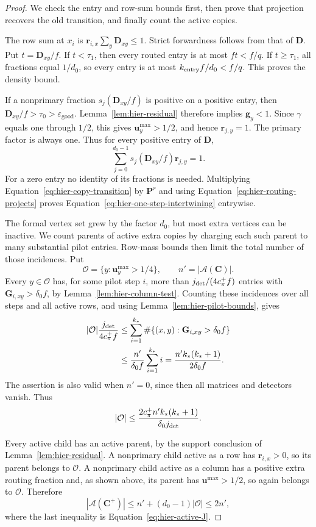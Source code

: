 \documentclass[11pt]{article}
\numberwithin{equation}{section}
\theoremstyle{definition}
\theoremstyle{remark}
\begin{document}
\begin{proof}
We check the entry and row-sum bounds first, then prove that projection recovers the old transition, and finally count the active copies.

The row sum at $x_i$ is ${\mathbf{r}}_{i,x}\sum_y{\mathbf{D}}_{xy}\leq1$.  Strict
forwardness follows from that of ${\mathbf{D}}$.  Put $t={\mathbf{D}}_{xy}/f$.  If
$t<\tau_1$, then every routed entry is at most $ft<f/q$.  If
$t\geq\tau_1$, all fractions equal $1/{d}_0$, so every entry is at
most ${k_{\rm entry}}f/{d}_0<f/q$.  This proves the density bound.

If a nonprimary fraction $s_j({\mathbf{D}}_{xy}/f)$ is positive on a positive
entry, then ${\mathbf{D}}_{xy}/f>\tau_0>\varepsilon_{\mathrm{good}}$.
Lemma~\ref{lem:hier-residual} therefore implies ${\mathbf{g}}_{y}<1$.
Since $\gamma$ equals one through $1/2$, this gives
${\mathbf{u}}^{\max}_{y}>1/2$, and hence ${\mathbf{r}}_{j,y}=1$.  The primary factor is
always one.  Thus for every positive entry of ${\mathbf{D}}$,
\begin{equation}
 \sum_{j=0}^{{d}_0-1}s_j({\mathbf{D}}_{xy}/f){\mathbf{r}}_{j,y}=1.
 \label{eq:hier-routing-projects}
\end{equation}
For a zero entry no identity of its fractions is needed.  Multiplying
Equation~\eqref{eq:hier-copy-transition} by ${\mathbf{P}}^r$ and using
Equation~\eqref{eq:hier-routing-projects} proves
Equation~\eqref{eq:hier-one-step-intertwining} entrywise.

The formal vertex set grew by the factor ${d}_0$, but most extra vertices can be inactive. We count parents of active extra copies by charging each such parent to many substantial pilot entries. Row-mass bounds then limit the total number of those incidences. Put
\[
 \mathcal O=\{y:{\mathbf{u}}^{\max}_{y}>1/4\},\qquad
 n'=|\mathcal A({\mathbf{C}})|.
\]
Every $y\in\mathcal O$ has, for some pilot step $i$, more than
${j_{\rm det}}/(4{c_\pi^+} f)$ entries with ${\mathbf{G}}_{i,xy}>\delta_0f$, by
Lemma~\ref{lem:hier-column-test}.  Counting these incidences over all
steps and all active rows, and using
Lemma~\ref{lem:hier-pilot-bounds}, gives
\begin{align*}
 |\mathcal O|\frac{{j_{\rm det}}}{4{c_\pi^+} f}
 &\leq\sum_{i=1}^{k_*}\#\{(x,y):{\mathbf{G}}_{i,xy}>\delta_0f\}\\
 &\leq\frac{n'}{\delta_0f}\sum_{i=1}^{k_*}i
   =\frac{n'k_*(k_*+1)}{2\delta_0f}.
\end{align*}
The assertion is also valid when $n'=0$, since then all matrices and
detectors vanish.  Thus
\[
 |\mathcal O|\leq
       \frac{2{c_\pi^+} n'k_*(k_*+1)}{\delta_0{j_{\rm det}}}.
\]

Every active child has an active parent, by the support conclusion of
Lemma~\ref{lem:hier-residual}.  A nonprimary child active as a row has
${\mathbf{r}}_{i,x}>0$, so its parent belongs to $\mathcal O$.  A nonprimary
child active as a column has a positive extra routing fraction and, as
shown above, its parent has ${\mathbf{u}}^{\max}>1/2$, so again belongs to
$\mathcal O$.  Therefore
\[
 |\mathcal A({\mathbf{C}}^+)|\leq n'+({d}_0-1)|\mathcal O|\leq2n',
\]
where the last inequality is Equation~\eqref{eq:hier-active-J}.
\end{proof}
\end{document}
